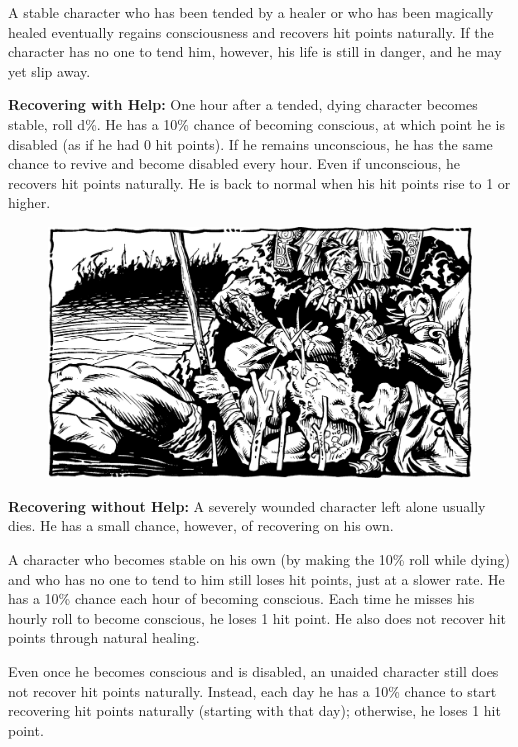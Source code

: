 A stable character who has been tended by a healer or who has been magically healed eventually regains consciousness and recovers hit points naturally. If the character has no one to tend him, however, his life is still in danger, and he may yet slip away.

\textbf{Recovering with Help:} One hour after a tended, dying character becomes stable, roll d\%. He has a 10\% chance of becoming conscious, at which point he is disabled (as if he had 0 hit points). If he remains unconscious, he has the same chance to revive and become disabled every hour. Even if unconscious, he recovers hit points naturally. He is back to normal when his hit points rise to 1 or higher.

\begin{figure}[b!]
\centering
\includegraphics[width=\textwidth]{images/heal-1.png}
\WOTC
\end{figure}

\textbf{Recovering without Help:} A severely wounded character left alone usually dies. He has a small chance, however, of recovering on his own.

A character who becomes stable on his own (by making the 10\% roll while dying) and who has no one to tend to him still loses hit points, just at a slower rate. He has a 10\% chance each hour of becoming conscious. Each time he misses his hourly roll to become conscious, he loses 1 hit point. He also does not recover hit points through natural healing.

Even once he becomes conscious and is disabled, an unaided character still does not recover hit points naturally. Instead, each day he has a 10\% chance to start recovering hit points naturally (starting with that day); otherwise, he loses 1 hit point.

